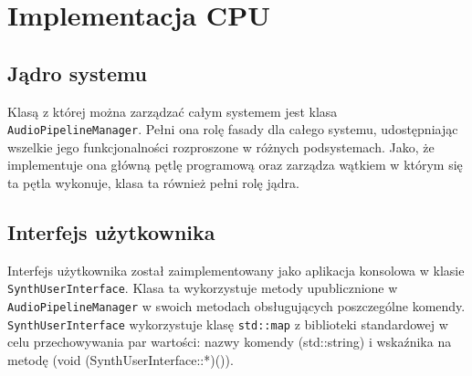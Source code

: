 \chapter{Implementacja CPU}

\section{Jądro systemu}
Klasą z której można zarządzać całym systemem jest klasa \texttt{AudioPipelineManager}. Pełni ona rolę fasady dla całego systemu, udostępniając wszelkie jego funkcjonalności rozproszone w różnych podsystemach. Jako, że implementuje ona główną pętlę programową oraz zarządza wątkiem w którym się ta pętla wykonuje, klasa ta również pełni rolę jądra. 

\section{Interfejs użytkownika}
Interfejs użytkownika został zaimplementowany jako aplikacja konsolowa w klasie \texttt{SynthUserInterface}. Klasa ta wykorzystuje metody upublicznione w \texttt{AudioPipelineManager} w swoich metodach obsługujących poszczególne komendy. \texttt{SynthUserInterface} wykorzystuje klasę \texttt{std::map} z biblioteki standardowej w celu przechowywania par wartości: nazwy komendy (std::string) i wskaźnika na metodę (void (SynthUserInterface::*)()). 